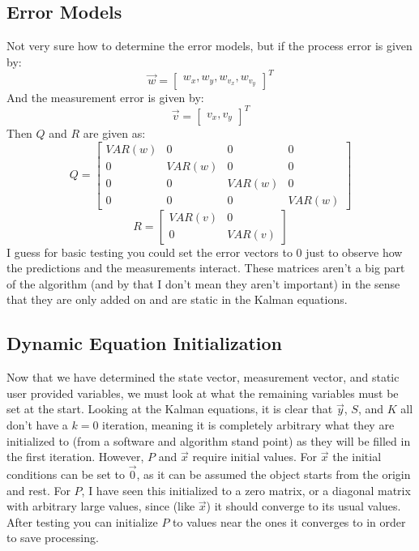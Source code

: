 \documentclass{article} %
\begin{document}
\subsection{Error Models}
Not very sure how to determine the error models, but if the process error is given by:
\begin{equation}
\vec{w} = 
\begin{bmatrix}
 w_x, w_y, w_{v_x}, w_{v_y}
\end{bmatrix}^T
\end{equation}
And the measurement error is given by:
\begin{equation}
\vec{v} = 
\begin{bmatrix}
 v_x, v_y
\end{bmatrix}^T
\end{equation}
Then $Q$ and $R$ are given as:
\begin{equation}
Q =
\begin{bmatrix}
VAR(w) & 0 & 0 & 0 \\
0 & VAR(w) & 0 & 0 \\
0 & 0 & VAR(w) & 0 \\
0 & 0 & 0 & VAR(w) 
\end{bmatrix}
\end{equation}
\begin{equation}
R =
\begin{bmatrix}
VAR(v) & 0 \\
0 & VAR(v) 
\end{bmatrix}
\end{equation}
I guess for basic testing you could set the error vectors to 0 just to observe how the predictions and the measurements interact. These matrices aren't a big part of the algorithm (and by that I don't mean they aren't important) in the sense that they are only added on and are static in the Kalman equations.
\subsection{Dynamic Equation Initialization}
Now that we have determined the state vector, measurement vector, and static user provided variables, we must look at what the remaining variables must be set at the start. Looking at the Kalman equations, it is clear that $\vec{y}$, $S$, and $K$ all don't have a $k = 0$ iteration, meaning it is completely arbitrary what they are initialized to (from a software and algorithm stand point) as they will be filled in the first iteration. However, $P$ and $\vec{x}$ require initial values. For $\vec{x}$ the initial conditions can be set to $\vec{0}$, as it can be assumed the object starts from the origin and rest. For $P$, I have seen this initialized to a zero matrix, or a diagonal matrix with arbitrary large values, since (like $\vec{x}$) it should converge to its usual values. After testing you can initialize $P$ to values near the ones it converges to in order to save processing.
\end{document}

